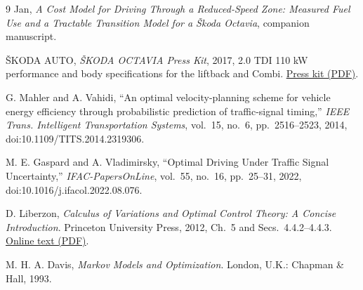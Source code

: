 \documentclass[journal,a4paper,twocolumn]{IEEEtran}
\begin{document}
\begin{thebibliography}{9}
Jan, \emph{A Cost Model for Driving Through a Reduced-Speed Zone: Measured Fuel Use and a Tractable Transition Model for a \v{S}koda Octavia}, companion manuscript.

\v{S}KODA AUTO, \emph{\v{S}KODA OCTAVIA Press Kit}, 2017, 2.0 TDI 110 kW performance and body specifications for the liftback and Combi.
\href{https://cdn.skoda-storyboard.com/2017/02/170207-\%C5\%A0KODA-OCTAVIA-Tiskov\%C3\%A1-mapa.pdf}{Press kit (PDF)}.

G. Mahler and A. Vahidi, ``An optimal velocity-planning scheme for vehicle energy efficiency through probabilistic prediction of traffic-signal timing,'' \emph{IEEE Trans. Intelligent Transportation Systems}, vol.~15, no.~6, pp.~2516--2523, 2014, doi:10.1109/TITS.2014.2319306.

M. E. Gaspard and A. Vladimirsky, ``Optimal Driving Under Traffic Signal Uncertainty,'' \emph{IFAC-PapersOnLine}, vol.~55, no.~16, pp.~25--31, 2022, doi:10.1016/j.ifacol.2022.08.076.

D. Liberzon, \emph{Calculus of Variations and Optimal Control Theory: A Concise Introduction}. Princeton University Press, 2012, Ch.~5 and Secs.~4.4.2--4.4.3.
\href{https://liberzon.csl.illinois.edu/teaching/cvoc.pdf}{Online text (PDF)}.

M. H. A. Davis, \emph{Markov Models and Optimization}. London, U.K.: Chapman \& Hall, 1993.
\end{thebibliography}
\end{document}
